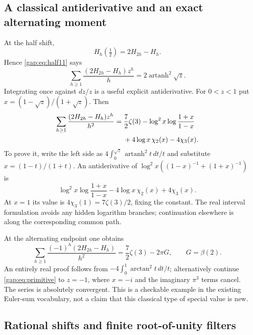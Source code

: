 \subsection{A classical antiderivative and an exact alternating moment}

At the half shift,
\[
 H_h(\tfrac12)=2H_{2h}-H_h.
\]
Hence \eqref{gap:eq:half11} says
\begin{equation}\label{gap:eq:harmonic-half}
 \sum_{h\geq1}\frac{(2H_{2h}-H_h)z^h}{h}
     =2\operatorname{artanh}^2\sqrt z.
\end{equation}
Integrating once against $dz/z$ is a useful explicit antiderivative.
For $0<z<1$ put \mbox{$x=(1-\sqrt z)/(1+\sqrt z)$}. Then
\begin{align}
 \sum_{h\geq1}\frac{(2H_{2h}-H_h)z^h}{h^2}
 ={}&\frac72\zeta(3)
   -\log^2x\log\frac{1+x}{1-x}\notag\\
   &+4\log x\,\chi_2(x)-4\chi_3(x).
 \label{gap:eq:primitive}
\end{align}
To prove it, write the left side as
$4\int_0^{\sqrt z}\operatorname{artanh}^2t\,dt/t$ and substitute
$x=(1-t)/(1+t)$. An antiderivative of
$\log^2x((1-x)^{-1}+(1+x)^{-1})$ is
\[
 \log^2x\log\frac{1+x}{1-x}
 -4\log x\,\chi_2(x)+4\chi_3(x).
\]
At $x=1$ its value is $4\chi_3(1)=7\zeta(3)/2$, fixing the constant.
The real interval formulation avoids any hidden logarithm branches;
continuation elsewhere is along the corresponding common path.

At the alternating endpoint one obtains
\begin{equation}\label{gap:eq:alternating-primitive}
 \sum_{h\geq1}\frac{(-1)^h(2H_{2h}-H_h)}{h^2}
       =\frac72\zeta(3)-2\pi G,
 \qquad G=\beta(2).
\end{equation}
An entirely real proof follows from
$-4\int_0^1\arctan^2t\,dt/t$; alternatively continue
\eqref{gap:eq:primitive} to $z=-1$, where $x=-i$ and the imaginary
$\pi^3$ terms cancel. The series is absolutely convergent.
This is a checkable example in the existing Euler-sum vocabulary,
not a claim that this classical type of special value is new.

\subsection{Rational shifts and finite root-of-unity filters}

